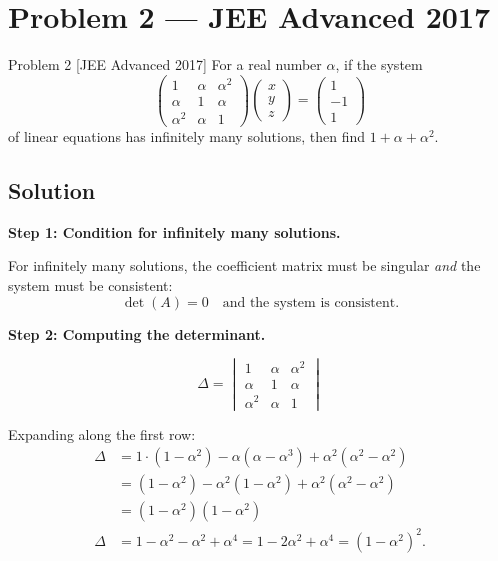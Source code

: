 \documentclass[12pt]{article}
\begin{document}
\section{Problem 2 — JEE Advanced 2017}

\begin{problembox}{Problem 2 \hfill \normalfont\small [JEE Advanced 2017]}
For a real number $\alpha$, if the system
\[
\begin{pmatrix} 1 & \alpha & \alpha^2 \\ \alpha & 1 & \alpha \\ \alpha^2 & \alpha & 1 \end{pmatrix}
\begin{pmatrix} x \\ y \\ z \end{pmatrix}
=
\begin{pmatrix} 1 \\ -1 \\ 1 \end{pmatrix}
\]
of linear equations has infinitely many solutions, then find $1 + \alpha + \alpha^2$.
\end{problembox}

\subsection*{Solution}

\textbf{Step 1: Condition for infinitely many solutions.}

For infinitely many solutions, the coefficient matrix must be singular \emph{and} the system must be consistent:
\[
\det(A) = 0 \quad \text{and the system is consistent.}
\]

\textbf{Step 2: Computing the determinant.}

\[
\Delta = \begin{vmatrix} 1 & \alpha & \alpha^2 \\ \alpha & 1 & \alpha \\ \alpha^2 & \alpha & 1 \end{vmatrix}
\]

Expanding along the first row:
\begin{align*}
\Delta &= 1\cdot(1 - \alpha^2) - \alpha(\alpha - \alpha^3) + \alpha^2(\alpha^2 - \alpha^2) \\
       &= (1 - \alpha^2) - \alpha^2(1 - \alpha^2) + \alpha^2(\alpha^2 - \alpha^2) \\
       &= (1-\alpha^2)(1 - \alpha^2) \\[4pt]
\Delta &= 1 - \alpha^2 - \alpha^2 + \alpha^4 = 1 - 2\alpha^2 + \alpha^4 = (1 - \alpha^2)^2.
\end{align*}
\end{document}
